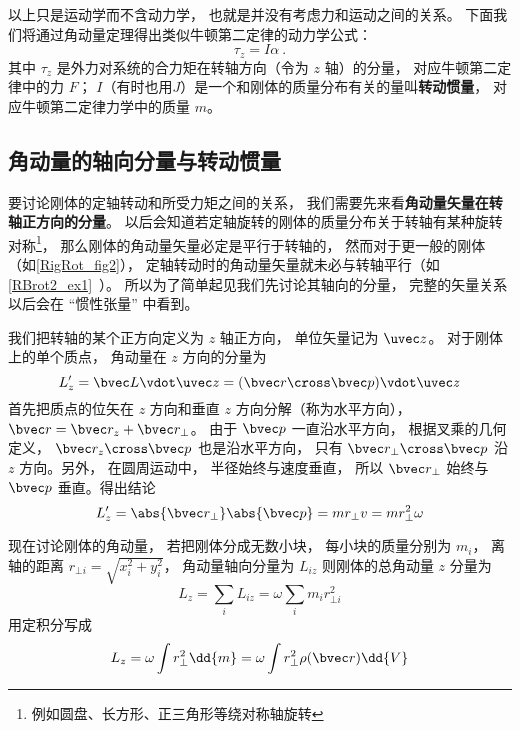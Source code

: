 以上只是运动学而不含动力学， 也就是并没有考虑力和运动之间的关系。 下面我们将通过角动量定理得出类似牛顿第二定律的动力学公式：
\begin{equation}
\tau_z = I \alpha~.
\end{equation}
其中 $\tau_z$ 是外力对系统的合力矩在转轴方向（令为 $z$ 轴）的分量， 对应牛顿第二定律中的力 $F$； $I$（有时也用$J$）是一个和刚体的质量分布有关的量叫\textbf{转动惯量}， 对应牛顿第二定律力学中的质量 $m$。

\subsection{角动量的轴向分量与转动惯量}
要讨论刚体的定轴转动和所受力矩之间的关系， 我们需要先来看\textbf{角动量矢量在转轴正方向的分量}。 以后会知道若定轴旋转的刚体的质量分布关于转轴有某种旋转对称\footnote{例如圆盘、长方形、正三角形等绕对称轴旋转}， 那么刚体的角动量矢量必定是平行于转轴的， 然而对于更一般的刚体（如\autoref{RigRot_fig2}）， 定轴转动时的角动量矢量就未必与转轴平行（如\autoref{RBrot2_ex1}~）。 所以为了简单起见我们先讨论其轴向的分量， 完整的矢量关系以后会在 “惯性张量” 中看到。

我们把转轴的某个正方向定义为 $z$ 轴正方向， 单位矢量记为 $\uvec z$。 对于刚体上的单个质点， 角动量在 $z$ 方向的分量为
\begin{equation}
L'_{z} = \bvec L \vdot \uvec z = (\bvec r \cross \bvec p) \vdot \uvec z
\end{equation}
首先把质点的位矢在 $z$ 方向和垂直 $z$ 方向分解（称为水平方向）， $\bvec r = \bvec r_z + \bvec r_ \bot$。 由于 $\bvec p$ 一直沿水平方向， 根据叉乘的几何定义， $\bvec r_z \cross \bvec p$ 也是沿水平方向， 只有 $\bvec r_ \bot \cross \bvec p$ 沿 $z$ 方向。另外， 在圆周运动中， 半径始终与速度垂直， 所以 $\bvec r_ \bot$ 始终与 $\bvec p$ 垂直。得出结论
\begin{equation}
L'_z = \abs{\bvec r_\bot} \abs{\bvec p} = m r_ \bot v = mr_ \bot ^2\omega 
\end{equation}

现在讨论刚体的角动量， 若把刚体分成无数小块， 每小块的质量分别为 $m_i$， 离轴的距离 $r_{\bot i} = \sqrt{x_i^2 + y_i^2} $， 角动量轴向分量为 $L_{iz}$ 则刚体的总角动量 $z$ 分量为
\begin{equation}
L_z = \sum_i L_{iz} = \omega \sum_i m_i r_{ \bot i}^2
\end{equation}
用定积分写成
\begin{equation}
L_z = \omega \int r_ \bot ^2 \dd{m} = \omega \int r_ \bot ^2\rho(\bvec r)  \dd{V} 
\end{equation}

